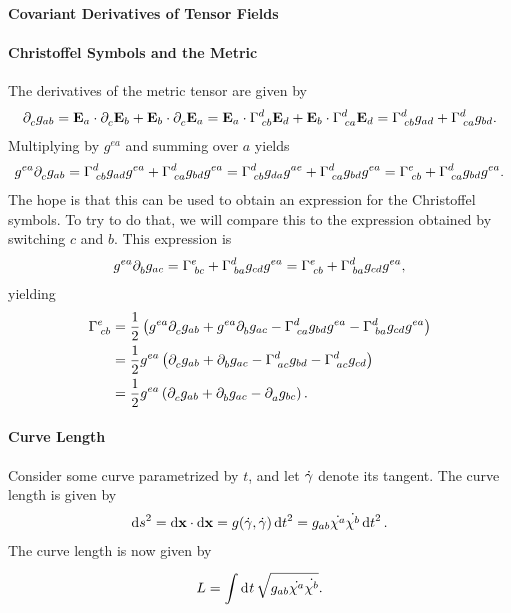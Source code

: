 \paragraph{Covariant Derivatives of Tensor Fields}

\paragraph{Christoffel Symbols and the Metric}
The derivatives of the metric tensor are given by
\begin{align*}
	\partial^{}_{c}g_{ab} = \vb{E}_{a}\cdot\partial^{}_{c}\vb{E}_{b} + \vb{E}_{b}\cdot\partial^{}_{c}\vb{E}_{a} = \vb{E}_{a}\cdot\Gamma^{d}_{\;cb}\vb{E}_{d} + \vb{E}_{b}\cdot\Gamma^{d}_{\;ca}\vb{E}_{d} = \Gamma^{d}_{\;cb}g_{ad} + \Gamma^{d}_{\;ca}g_{bd}.
\end{align*}
Multiplying by $g^{ea}$ and summing over $a$ yields
\begin{align*}
	g^{ea}\partial^{}_{c}g_{ab} = \Gamma^{d}_{\;cb}g_{ad}g^{ea} + \Gamma^{d}_{\;ca}g_{bd}g^{ea} = \Gamma^{d}_{\;cb}g_{da}g^{ae} + \Gamma^{d}_{\;ca}g_{bd}g^{ea} = \Gamma^{e}_{\;cb} + \Gamma^{d}_{\;ca}g_{bd}g^{ea}.
\end{align*}
The hope is that this can be used to obtain an expression for the Christoffel symbols. To try to do that, we will compare this to the expression obtained by switching $c$ and $b$. This expression is
\begin{align*}
	g^{ea}\partial^{}_{b}g_{ac} = \Gamma^{e}_{\;bc} + \Gamma^{d}_{\;ba}g_{cd}g^{ea} = \Gamma^{e}_{\;cb} + \Gamma^{d}_{\;ba}g_{cd}g^{ea},
\end{align*}
yielding
\begin{align*}
	\Gamma^{e}_{\;cb} &= \frac{1}{2}\left(g^{ea}\partial^{}_{c}g_{ab} + g^{ea}\partial^{}_{b}g_{ac} - \Gamma^{d}_{\;ca}g_{bd}g^{ea} - \Gamma^{d}_{\;ba}g_{cd}g^{ea}\right) \\
	                &= \frac{1}{2}g^{ea}\left(\partial^{}_{c}g_{ab} + \partial^{}_{b}g_{ac} - \Gamma^{d}_{\;ac}g_{bd} - \Gamma^{d}_{\;ac}g_{cd}\right) \\
	                &= \frac{1}{2}g^{ea}\left(\partial^{}_{c}g_{ab} + \partial^{}_{b}g_{ac} - \partial^{}_{a}g_{bc}\right).
\end{align*}

\paragraph{Curve Length}
Consider some curve parametrized by $t$, and let $\dot{\vb{\gamma}}$ denote its tangent. The curve length is given by
\begin{align*}
	\dd{s}^{2} = \dd{\vb{x}}\cdot\dd{\vb{x}} = g(\dot{\vb{\gamma}}, \dot{\vb{\gamma}})\dd{t}^{2} = g_{ab}\dot{\chi^{a}}\dot{\chi^{b}}\dd{t}^{2}.
\end{align*}
The curve length is now given by
\begin{align*}
	L = \int\limits_{}^{}\dd[]{t}\sqrt{g_{ab}\dot{\chi^{a}}\dot{\chi^{b}}}.
\end{align*}

